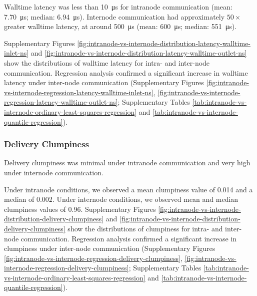 Walltime latency was less than \SI{10}{\micro\second} for intranode communication (mean: \SI{7.70}{\micro\second}; median: \SI{6.94}{\micro\second}).
Internode communication had approximately $50\times$ greater walltime latency, at around \SI{500}{\micro\second} (mean: \SI{600}{\micro\second}; median: \SI{551}{\micro\second}).

Supplementary Figures \ref{fig:intranode-vs-internode-distribution-latency-walltime-inlet-ns} and \ref{fig:intranode-vs-internode-distribution-latency-walltime-outlet-ns} show the distributions of walltime latency for intra- and inter-node communication.
Regression analysis confirmed a significant increase in walltime latency under inter-node communication (Supplementary Figures \ref{fig:intranode-vs-internode-regression-latency-walltime-inlet-ns}, \ref{fig:intranode-vs-internode-regression-latency-walltime-outlet-ns}; Supplementary Tables \ref{tab:intranode-vs-internode-ordinary-least-squares-regression} and \ref{tab:intranode-vs-internode-quantile-regression}).

\subsubsection{Delivery Clumpiness}

Delivery clumpiness was minimal under intranode communication and very high under internode communication.

Under intranode conditions, we observed a mean clumpiness value of 0.014 and a median of 0.002.
Under internode conditions, we observed mean and median clumpiness values of 0.96.
Supplementary Figures \ref{fig:intranode-vs-internode-distribution-delivery-clumpiness} and \ref{fig:intranode-vs-internode-distribution-delivery-clumpiness} show the distributions of clumpiness for intra- and inter-node communication.
Regression analysis confirmed a significant increase in clumpiness under inter-node communication (Supplementary Figures \ref{fig:intranode-vs-internode-regression-delivery-clumpiness}, \ref{fig:intranode-vs-internode-regression-delivery-clumpiness}; Supplementary Tables \ref{tab:intranode-vs-internode-ordinary-least-squares-regression} and \ref{tab:intranode-vs-internode-quantile-regression}).

